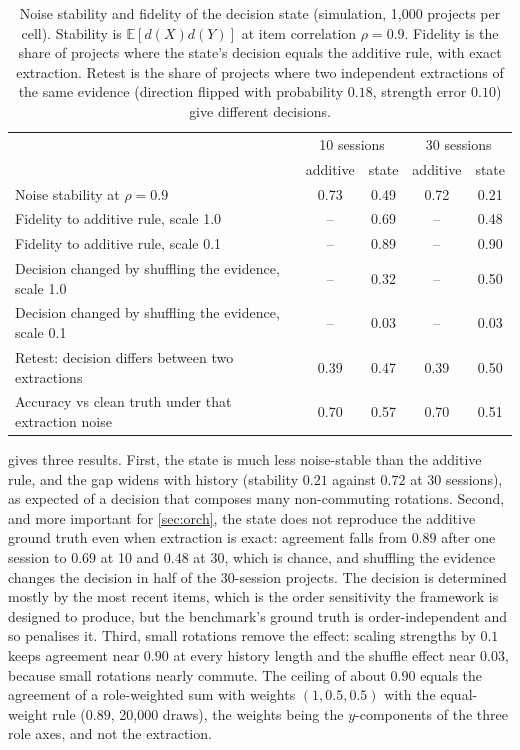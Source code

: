 \documentclass[11pt]{article}
\theoremstyle{definition}
\theoremstyle{remark}
\begin{document}
\begin{table}[t]
\centering
\caption{Noise stability and fidelity of the decision state (simulation, 1{,}000 projects per cell). Stability is $\mathbb{E}[d(X)d(Y)]$ at item correlation $\rho=0.9$. Fidelity is the share of projects where the state's decision equals the additive rule, with exact extraction. Retest is the share of projects where two independent extractions of the same evidence (direction flipped with probability $0.18$, strength error $0.10$) give different decisions.}
\label{tab:noise}
\small
\begin{tabular}{lcccc}
\toprule
 & \multicolumn{2}{c}{10 sessions} & \multicolumn{2}{c}{30 sessions}\\
 & additive & state & additive & state\\
\midrule
Noise stability at $\rho=0.9$ & 0.73 & 0.49 & 0.72 & 0.21\\
Fidelity to additive rule, scale 1.0 & -- & 0.69 & -- & 0.48\\
Fidelity to additive rule, scale 0.1 & -- & 0.89 & -- & 0.90\\
Decision changed by shuffling the evidence, scale 1.0 & -- & 0.32 & -- & 0.50\\
Decision changed by shuffling the evidence, scale 0.1 & -- & 0.03 & -- & 0.03\\
Retest: decision differs between two extractions & 0.39 & 0.47 & 0.39 & 0.50\\
Accuracy vs clean truth under that extraction noise & 0.70 & 0.57 & 0.70 & 0.51\\
\bottomrule
\end{tabular}
\end{table}

 gives three results. First, the state is much less noise-stable than the additive rule, and the gap widens with history (stability $0.21$ against $0.72$ at 30 sessions), as expected of a decision that composes many non-commuting rotations. Second, and more important for \cref{sec:orch}, the state does not reproduce the additive ground truth even when extraction is exact: agreement falls from $0.89$ after one session to $0.69$ at 10 and $0.48$ at 30, which is chance, and shuffling the evidence changes the decision in half of the 30-session projects. The decision is determined mostly by the most recent items, which is the order sensitivity the framework is designed to produce, but the benchmark's ground truth is order-independent and so penalises it. Third, small rotations remove the effect: scaling strengths by $0.1$ keeps agreement near $0.90$ at every history length and the shuffle effect near $0.03$, because small rotations nearly commute. The ceiling of about $0.90$ equals the agreement of a role-weighted sum with weights $(1, 0.5, 0.5)$ with the equal-weight rule ($0.89$, 20{,}000 draws), the weights being the $y$-components of the three role axes, and not the extraction.
\end{document}
